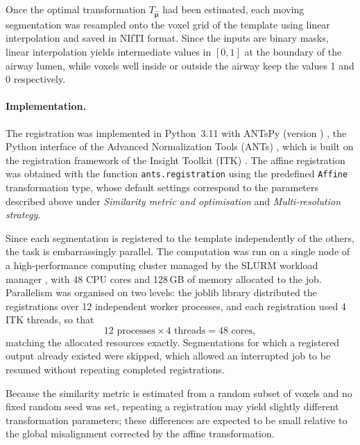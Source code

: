Once the optimal transformation $T_{\hat{\boldsymbol{\mu}}}$ had been estimated,
each moving segmentation was resampled onto the voxel grid of the template using
linear interpolation and saved in NIfTI format. Since the inputs are binary
masks, linear interpolation yields intermediate values in $[0,1]$ at the
boundary of the airway lumen, while voxels well inside or outside the airway
keep the values 1 and 0 respectively.

\paragraph{Implementation.}      %

The registration was implemented in Python~3.11 with ANTsPy (version
\antspyversion) \cite{tustison2021antsx}, the Python interface of the Advanced
Normalization Tools (ANTs) \cite{avants2009ants}, which is built on the
registration framework of the Insight Toolkit (ITK) \cite{avants2014itkv4}. The
affine registration was obtained with the function \texttt{ants.registration}
using the predefined \texttt{Affine} transformation type, whose default settings
correspond to the parameters described above under \emph{Similarity metric and
optimisation} and \emph{Multi-resolution strategy}.

Since each segmentation is registered to the template independently of the
others, the task is embarrassingly parallel. The computation was run on a single
node of a high-performance computing cluster managed by the SLURM workload
manager \cite{yoo2003slurm}, with 48 CPU cores and 128\,GB of memory allocated
to the job. Parallelism was organised on two levels: the joblib library
\cite{joblib} distributed the registrations over 12 independent worker
processes, and each registration used 4 ITK threads, so that
\begin{equation}
  12 \text{ processes} \times 4 \text{ threads} = 48 \text{ cores},
  \label{eq:cores}               %
\end{equation}
matching the allocated resources exactly. Segmentations for which a registered
output already existed were skipped, which allowed an interrupted job to be
resumed without repeating completed registrations.

Because the similarity metric is estimated from a random subset of voxels and no
fixed random seed was set, repeating a registration may yield slightly different
transformation parameters; these differences are expected to be small relative
to the global misalignment corrected by the affine transformation.

